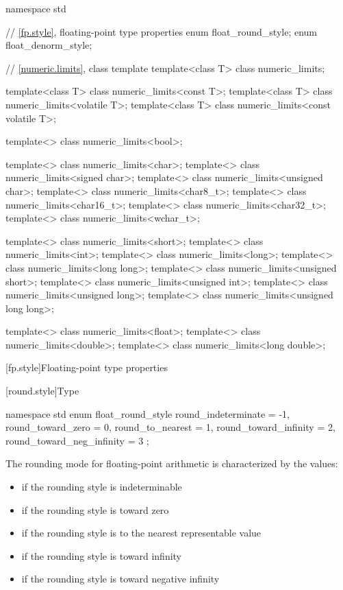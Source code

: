 \begin{codeblock}
namespace std {
  // \ref{fp.style}, floating-point type properties
  enum float_round_style;
  enum float_denorm_style;

  // \ref{numeric.limits}, class template 
  template<class T> class numeric_limits;

  template<class T> class numeric_limits<const T>;
  template<class T> class numeric_limits<volatile T>;
  template<class T> class numeric_limits<const volatile T>;

  template<> class numeric_limits<bool>;

  template<> class numeric_limits<char>;
  template<> class numeric_limits<signed char>;
  template<> class numeric_limits<unsigned char>;
  template<> class numeric_limits<char8_t>;
  template<> class numeric_limits<char16_t>;
  template<> class numeric_limits<char32_t>;
  template<> class numeric_limits<wchar_t>;

  template<> class numeric_limits<short>;
  template<> class numeric_limits<int>;
  template<> class numeric_limits<long>;
  template<> class numeric_limits<long long>;
  template<> class numeric_limits<unsigned short>;
  template<> class numeric_limits<unsigned int>;
  template<> class numeric_limits<unsigned long>;
  template<> class numeric_limits<unsigned long long>;

  template<> class numeric_limits<float>;
  template<> class numeric_limits<double>;
  template<> class numeric_limits<long double>;
}
\end{codeblock}

[fp.style]{Floating-point type properties}

[round.style]{Type }

%
\begin{codeblock}
namespace std {
  enum float_round_style {
    round_indeterminate       = -1,
    round_toward_zero         =  0,
    round_to_nearest          =  1,
    round_toward_infinity     =  2,
    round_toward_neg_infinity =  3
  };
}
\end{codeblock}

\pnum
The rounding mode for floating-point arithmetic is characterized by the
values:

\begin{itemize}
\item
{}%
if the rounding style is indeterminable
\item
{}%
if the rounding style is toward zero
\item
{}%
if the rounding style is to the nearest representable value
\item
{}%
if the rounding style is toward infinity
\item
{}%
if the rounding style is toward negative infinity
\end{itemize}

